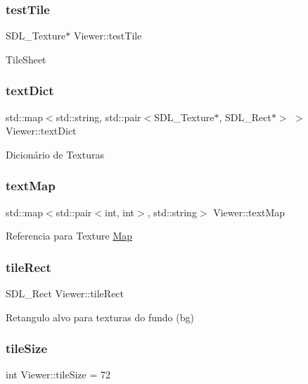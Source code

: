 \subsubsection{\texorpdfstring{test\+Tile}{testTile}}
{\footnotesize\ttfamily S\+D\+L\+\_\+\+Texture$\ast$ Viewer\+::test\+Tile}

Tile\+Sheet \mbox{\label{classViewer_a336123429ce452088ba9833f8f80cfff}} 
\subsubsection{\texorpdfstring{text\+Dict}{textDict}}
{\footnotesize\ttfamily std\+::map$<$std\+::string, std\+::pair$<$S\+D\+L\+\_\+\+Texture$\ast$, S\+D\+L\+\_\+\+Rect$\ast$$>$ $>$ Viewer\+::text\+Dict}

Dicionário de Texturas \mbox{\label{classViewer_a34e0e3043d5155be7fbaef0b07b647f8}} 
\subsubsection{\texorpdfstring{text\+Map}{textMap}}
{\footnotesize\ttfamily std\+::map$<$std\+::pair$<$int, int$>$, std\+::string$>$ Viewer\+::text\+Map}

Referencia para Texture \hyperlink{classMap}{Map} \mbox{\label{classViewer_a7e38c4e4399e4e4f4d9a1a148843d7f5}} 
\subsubsection{\texorpdfstring{tile\+Rect}{tileRect}}
{\footnotesize\ttfamily S\+D\+L\+\_\+\+Rect Viewer\+::tile\+Rect}

Retangulo alvo para texturas do fundo (bg) \mbox{\label{classViewer_a1c2c61744bd1f39a6c99671105eee03d}} 
\subsubsection{\texorpdfstring{tile\+Size}{tileSize}}
{\footnotesize\ttfamily int Viewer\+::tile\+Size = 72}

